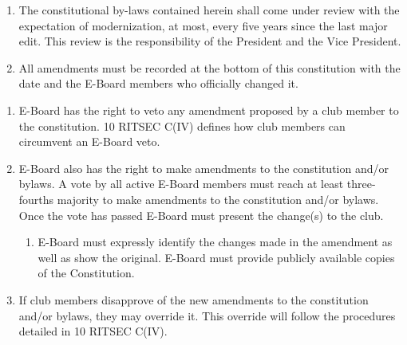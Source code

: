 


\begin{enumerate}
  \item The constitutional by-laws contained herein shall come under review
    with the expectation of modernization, at most, every five years since the
    last major edit. This review is the responsibility of the President and the Vice President.
  \item All amendments must be recorded at the bottom of this constitution with
    the date and the E-Board members who officially changed it.
\end{enumerate}


\begin{enumerate}
  \item E-Board has the right to veto any amendment proposed by a club member
    to the constitution. 10 RITSEC C(IV) defines how club members can circumvent 
    an E-Board veto.
  \item E-Board also has the right to make amendments to the constitution
    and/or bylaws. A vote by all active E-Board members must reach at least
    three-fourths majority to make amendments to the constitution and/or
    bylaws. Once the vote has passed E-Board must present the change(s) to the
    club.
  \begin{enumerate}
    \item E-Board must expressly identify the changes made in the amendment as
      well as show the original. E-Board must provide publicly available copies
      of the Constitution.
  \end{enumerate}
  \item If club members disapprove of the new amendments to the
    constitution and/or bylaws, they may override it. This override will follow
    the procedures detailed in 10 RITSEC C(IV).
\end{enumerate}



